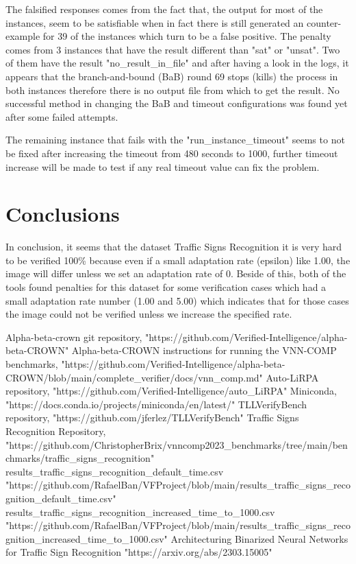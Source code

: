 \documentclass[12pt,a4paper]{report}
\newcommand\tab[1][5mm]{\hspace*{#1}}
\begin{document}
The falsified responses comes from the fact that, the output for most of the instances, seem to be satisfiable when in fact there is still generated an counter-example for 39 of the instances which turn to be a false positive. The penalty comes from 3 instances that have the result different than "sat" or "unsat". Two of them have the result "no\_result\_in\_file" and after having a look in the logs, it appears that the branch-and-bound (BaB) round 69 stops (kills) the process in both instances therefore there is no output file from which to get the result. No successful method in changing the BaB and timeout configurations was found yet after some failed attempts.

The remaining instance that fails with the "run\_instance\_timeout" seems to not be fixed after increasing the timeout from 480 seconds to 1000, further timeout increase will be made to test if any real timeout value can fix the problem.

\chapter{Conclusions}
\tab In conclusion, it seems that the dataset Traffic Signs Recognition\cite{traffic_signs_recognition} it is very hard to be verified 100\% because even if a small adaptation rate (epsilon) like 1.00, the image will differ unless we set an adaptation rate of 0. Beside of this, both of the tools found penalties for this dataset for some verification cases which had a small adaptation rate number (1.00 and 5.00) which indicates that for those cases the image could not be verified unless we increase the specified rate.

\begin{thebibliography}{1}
 Alpha-beta-crown git repository, "https://github.com/Verified-Intelligence/alpha-beta-CROWN"
 Alpha-beta-CROWN instructions for running the VNN-COMP benchmarks, "https://github.com/Verified-Intelligence/alpha-beta-CROWN/blob/main/complete\_verifier/docs/vnn\_comp.md"
 Auto-LiRPA repository, "https://github.com/Verified-Intelligence/auto\_LiRPA"
 Miniconda, "https://docs.conda.io/projects/miniconda/en/latest/"
 TLLVerifyBench repository, "https://github.com/jferlez/TLLVerifyBench"
 Traffic Signs Recognition Repository, "https://github.com/ChristopherBrix/vnncomp2023\_benchmarks/tree/main/benchmarks/traffic\_signs\_recognition"
 results\_traffic\_signs\_recognition\_default\_time.csv
"https://github.com/RafaelBan/VFProject/blob/main/results\_traffic\_signs\_recognition\_default\_time.csv"
 results\_traffic\_signs\_recognition\_increased\_time\_to\_1000.csv
"https://github.com/RafaelBan/VFProject/blob/main/results\_traffic\_signs\_recognition\_increased\_time\_to\_1000.csv"
Architecturing Binarized Neural Networks for Traffic Sign Recognition
"https://arxiv.org/abs/2303.15005"
\end{thebibliography}
\end{document}
